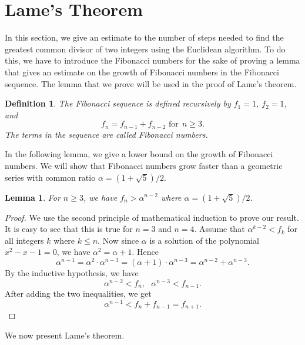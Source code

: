 \documentclass[12pt,letterpaper]{book}
\newtheorem{definition}{Definition}
\newtheorem{lemma}{Lemma}
\begin{document}
\newpage

\section{Lame's Theorem} 
In this section, we give an estimate to the number of steps needed
to find the greatest common divisor of two integers using the
Euclidean algorithm.  To do this, we have to introduce the Fibonacci
numbers for the sake of proving a lemma that gives an estimate on
the growth of Fibonacci numbers in the Fibonacci sequence.  The
lemma that we prove will be used in the proof of Lame's theorem.
\begin{definition}
The Fibonacci sequence is defined
recursively by $f_1=1$, $f_2=1$, and
\begin{equation*}
f_{n}=f_{n-1}+f_{n-2} \mbox{ for} \ \  n\geq 3.
\end{equation*}
The terms in the sequence are called Fibonacci numbers.
\end{definition}

In the following lemma, we give a lower bound on the growth of
Fibonacci numbers. We will show that Fibonacci numbers grow faster
than a geometric series with common ratio $\alpha=(1+\sqrt{5})/2$.

\begin{lemma}\label{lem2}
For $n\geq 3$, we have $f_n>\alpha^{n-2}$ where
$\alpha=(1+\sqrt{5})/2$.
\end{lemma}

\begin{proof}
We use the second principle of mathematical induction to prove our
result.  It is easy to see that this is true for $n=3$ and $n=4$.
Assume that $\alpha^{k-2}<f_k$ for all integers $k$ where $k\leq n$.
Now since $\alpha$ is a solution of the polynomial $x^2-x-1=0$, we
have $\alpha^2=\alpha+1$. Hence
\begin{equation*}
\alpha^{n-1}=\alpha^2\cdot\alpha^{n-3}=(\alpha+1)\cdot\alpha^{n-3}=\alpha^{n-2}+\alpha^{n-3}.
\end{equation*}
By the inductive hypothesis, we have
\begin{equation*}
\alpha^{n-2}<f_n, \ \ \ \alpha^{n-3}<f_{n-1}.
\end{equation*}
After adding the two inequalities, we get
\begin{equation*}
\alpha^{n-1}<f_{n}+f_{n-1}=f_{n+1}.
\end{equation*}
\end{proof}
We now present Lame's theorem.
\end{document}
